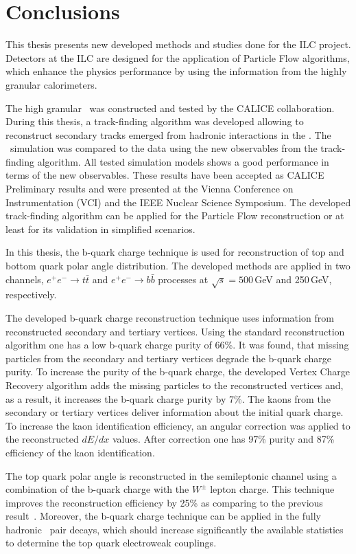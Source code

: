 \section*{Conclusions}
This thesis presents new developed methods and studies done for the ILC project.
Detectors at the ILC are designed for the application of Particle Flow algorithms, which enhance the physics performance by using the information from the highly granular calorimeters. 

The high granular \ecalp\ was constructed and tested by the CALICE collaboration. 
During this thesis, a track-finding algorithm was developed allowing to reconstruct secondary tracks emerged from hadronic interactions in the \ecalp.
The \ecalp\ simulation was compared to the data using the new observables from the track-finding algorithm. 
All tested simulation models shows a good performance in terms of the new observables. 
These results have been accepted as CALICE Preliminary results and were presented at the Vienna Conference on Instrumentation (VCI) and the IEEE Nuclear Science Symposium.
The developed track-finding algorithm can be applied for the Particle Flow reconstruction or at least for its validation in simplified scenarios.

In this thesis, the b-quark charge technique is used for reconstruction of top and bottom quark polar angle distribution.
The developed methods are applied in two channels, $e^+e^-\to t\bar{t}$ and $e^+e^-\to b\bar{b}$ processes at $\sqrt{s} = 500$\,GeV and 250\,GeV, respectively.

The developed b-quark charge reconstruction technique uses information from reconstructed secondary and tertiary vertices. 
Using the standard reconstruction algorithm one has a low b-quark charge purity of 66\%.
It was found, that missing particles from the secondary and tertiary vertices degrade the b-quark charge purity. 
To increase the purity of the b-quark charge, the developed Vertex Charge Recovery algorithm adds the missing particles to the reconstructed vertices and, as a result, it increases the b-quark charge purity by 7\%.
The kaons from the secondary or tertiary vertices deliver information about the initial quark charge. 
To increase the kaon identification efficiency, an angular correction was applied to the reconstructed $dE/dx$ values. 
After correction one has 97\% purity and 87\% efficiency of the kaon identification.

The top quark polar angle is reconstructed in the semileptonic channel using a combination of the b-quark charge with the $W^\pm$ lepton charge. 
This technique improves the reconstruction efficiency by 25\% as comparing to the previous result~\cite{bib:ILCTOP}.
Moreover, the b-quark charge technique can be applied in the fully hadronic \ttbar\ pair decays, which should increase significantly the available statistics to determine the top quark electroweak couplings. 


